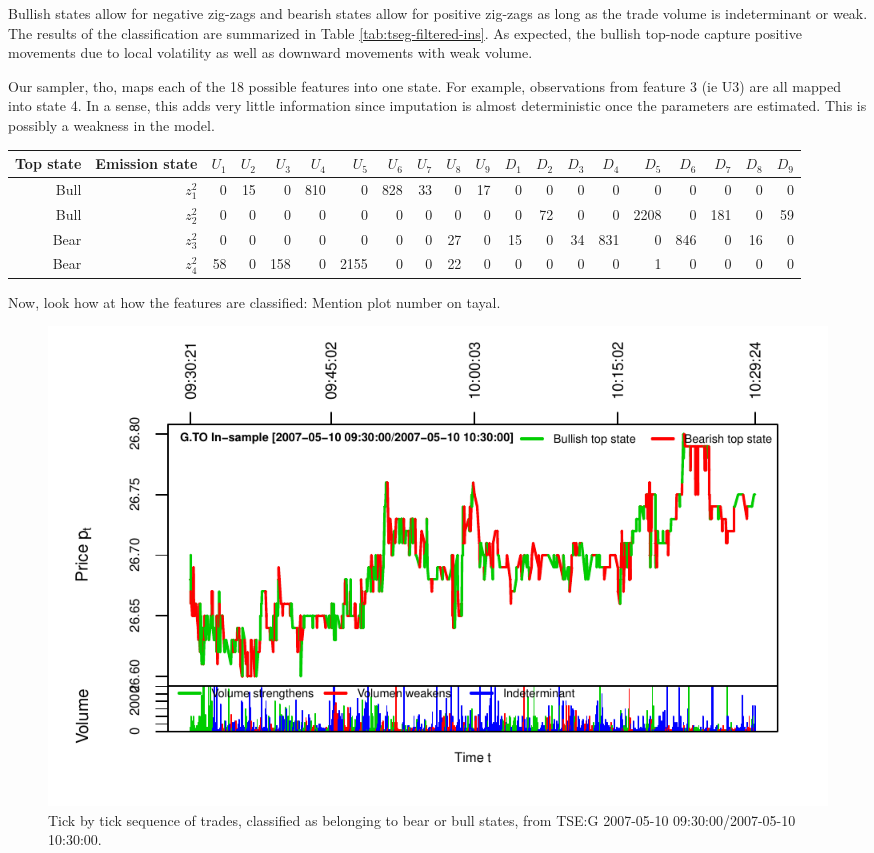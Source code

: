 \documentclass[]{article}
\begin{document}
Bullish states allow for negative zig-zags and bearish states allow for
positive zig-zags as long as the trade volume is indeterminant or weak.
The results of the classification are summarized in Table
\ref{tab:tseg-filtered-ins}. As expected, the bullish top-node capture
positive movements due to local volatility as well as downward movements
with weak volume.

Our sampler, tho, maps each of the 18 possible features into one state.
For example, observations from feature 3 (ie U3) are all mapped into
state 4. In a sense, this adds very little information since imputation
is almost deterministic once the parameters are estimated. This is
possibly a weakness in the model.

\tiny

\begin{longtable}[]{@{}rrrrrrrrrrrrrrrrrrrr@{}}
\toprule
Top state & Emission state & \(U_{1}\) & \(U_{2}\) & \(U_{3}\) &
\(U_{4}\) & \(U_{5}\) & \(U_{6}\) & \(U_{7}\) & \(U_{8}\) & \(U_{9}\) &
\(D_{1}\) & \(D_{2}\) & \(D_{3}\) & \(D_{4}\) & \(D_{5}\) & \(D_{6}\) &
\(D_{7}\) & \(D_{8}\) & \(D_{9}\)\tabularnewline
\midrule
\endhead
Bull & \(z^2_{1}\) & 0 & 15 & 0 & 810 & 0 & 828 & 33 & 0 & 17 & 0 & 0 &
0 & 0 & 0 & 0 & 0 & 0 & 0\tabularnewline
Bull & \(z^2_{2}\) & 0 & 0 & 0 & 0 & 0 & 0 & 0 & 0 & 0 & 0 & 72 & 0 & 0
& 2208 & 0 & 181 & 0 & 59\tabularnewline
Bear & \(z^2_{3}\) & 0 & 0 & 0 & 0 & 0 & 0 & 0 & 27 & 0 & 15 & 0 & 34 &
831 & 0 & 846 & 0 & 16 & 0\tabularnewline
Bear & \(z^2_{4}\) & 58 & 0 & 158 & 0 & 2155 & 0 & 0 & 22 & 0 & 0 & 0 &
0 & 0 & 1 & 0 & 0 & 0 & 0\tabularnewline
\bottomrule
\end{longtable}

\normalsize

Now, look how at how the features are classified: Mention plot number on
tayal.

\begin{figure}[H]
\includegraphics[width=\textwidth]{main_files/figure-latex/unnamed-chunk-17-1} \caption{Tick by tick sequence of trades, classified as belonging to bear or bull states, from TSE:G 2007-05-10 09:30:00/2007-05-10 10:30:00. \label{fig:tseg-ins-seqv}}\label{fig:unnamed-chunk-17}
\end{figure}
\end{document}
